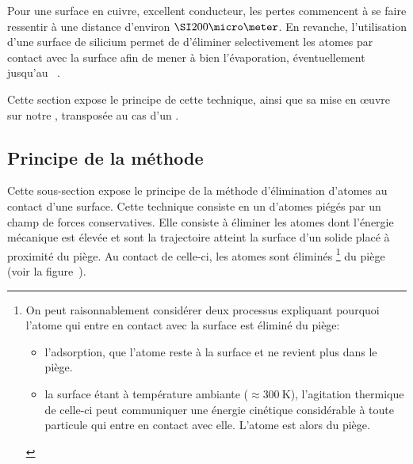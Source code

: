 \casse

Pour une surface en cuivre, excellent conducteur, les pertes commencent à se faire ressentir à une distance d'environ $\micron{200}$. 
En revanche, l'utilisation d'une surface de silicium permet de d'éliminer selectivement les atomes par contact avec la surface afin de mener à bien l'évaporation, éventuellement jusqu'au \rdq~\cite{LTC04}.


Cette section expose le principe de cette technique, ainsi que sa mise en \oe uvre sur notre \setup, \cad transposée au cas d'un \jatgm.


\subsection{Principe de la méthode}
Cette sous-section expose le principe de la méthode d'élimination d'atomes au contact d'une surface. Cette technique consiste en un \fispse d'atomes piégés par un champ de forces conservatives. 
Elle consiste 
à éliminer les atomes dont l'énergie mécanique est élevée et sont la trajectoire atteint la surface d'un solide placé à proximité du piège. Au contact de celle-ci, les atomes sont éliminés%
\footnote
{
On peut raisonnablement considérer deux processus expliquant pourquoi l'atome qui entre en contact avec la surface est éliminé du piège:
\begin{itemize}
	\item l'adsorption, \cad que l'atome reste  à la surface et ne revient plus dans le piège.
	\item la surface étant à température ambiante ($\approx\SI{300}{\kelvin}$), l'agitation thermique de celle-ci peut communiquer une énergie cinétique considérable à toute particule qui  entre en contact avec elle. L'atome est alors  du piège.
\end{itemize}
}
du piège (voir la figure~).
\bfigh
\RemonteUnPeuFig
{} \qquad \qquad \qquad
{}
\label{fig:CeramPrincipe}
\efigh

